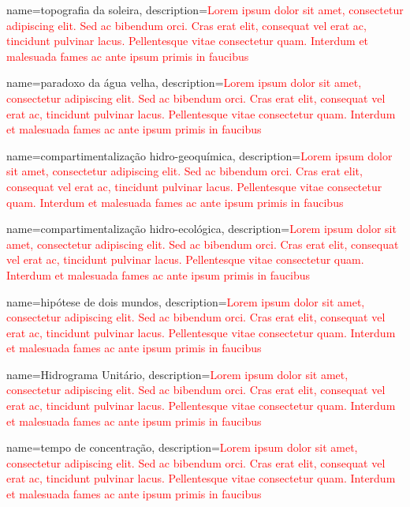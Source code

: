 {
    name=topografia da soleira,
    description={\textcolor{red}{Lorem ipsum dolor sit amet, consectetur adipiscing elit. Sed ac bibendum orci. Cras erat elit, consequat vel erat ac, tincidunt pulvinar lacus. Pellentesque vitae consectetur quam. Interdum et malesuada fames ac ante ipsum primis in faucibus}}
}

{
    name=paradoxo da água velha,
    description={\textcolor{red}{Lorem ipsum dolor sit amet, consectetur adipiscing elit. Sed ac bibendum orci. Cras erat elit, consequat vel erat ac, tincidunt pulvinar lacus. Pellentesque vitae consectetur quam. Interdum et malesuada fames ac ante ipsum primis in faucibus}}
}

{
    name=compartimentalização hidro-geoquímica,
    description={\textcolor{red}{Lorem ipsum dolor sit amet, consectetur adipiscing elit. Sed ac bibendum orci. Cras erat elit, consequat vel erat ac, tincidunt pulvinar lacus. Pellentesque vitae consectetur quam. Interdum et malesuada fames ac ante ipsum primis in faucibus}}
}

{
    name=compartimentalização hidro-ecológica,
    description={\textcolor{red}{Lorem ipsum dolor sit amet, consectetur adipiscing elit. Sed ac bibendum orci. Cras erat elit, consequat vel erat ac, tincidunt pulvinar lacus. Pellentesque vitae consectetur quam. Interdum et malesuada fames ac ante ipsum primis in faucibus}}
}

{
    name=hipótese de dois mundos,
    description={\textcolor{red}{Lorem ipsum dolor sit amet, consectetur adipiscing elit. Sed ac bibendum orci. Cras erat elit, consequat vel erat ac, tincidunt pulvinar lacus. Pellentesque vitae consectetur quam. Interdum et malesuada fames ac ante ipsum primis in faucibus}}
}

{
    name=Hidrograma Unitário,
    description={\textcolor{red}{Lorem ipsum dolor sit amet, consectetur adipiscing elit. Sed ac bibendum orci. Cras erat elit, consequat vel erat ac, tincidunt pulvinar lacus. Pellentesque vitae consectetur quam. Interdum et malesuada fames ac ante ipsum primis in faucibus}}
}

{
    name=tempo de concentração,
    description={\textcolor{red}{Lorem ipsum dolor sit amet, consectetur adipiscing elit. Sed ac bibendum orci. Cras erat elit, consequat vel erat ac, tincidunt pulvinar lacus. Pellentesque vitae consectetur quam. Interdum et malesuada fames ac ante ipsum primis in faucibus}}
}

